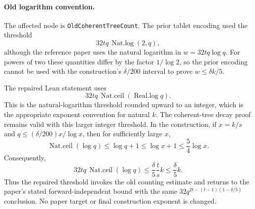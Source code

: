 \paragraph{Old logarithm convention.}
The affected node is \texttt{OldCoherentTreeCount}.  The prior tablet
encoding used the threshold
\[
 32tq\,\operatorname{Nat.log}(2,q),
\]
although the reference paper uses the natural logarithm in
$w=32tq\log q$.  For powers of two these quantities differ by the factor
$1/\log 2$, so the prior encoding cannot be used with the construction's
$\delta/200$ interval to prove $w\leq\delta k/5$.

The repaired Lean statement uses
\[
 32tq\,\operatorname{Nat.ceil}(\operatorname{Real.log}q).
\]
This is the natural-logarithm threshold rounded upward to an integer, which
is the appropriate exponent convention for natural $k$.  The coherent-tree
decay proof remains valid with this larger integer threshold.  In the
construction, if $x=k/s$ and
$q\leq(\delta/200)x/\log x$, then for sufficiently large $x$,
\[
 \operatorname{Nat.ceil}(\log q)
 \leq \log q+1
 \leq \log x+1
 \leq \frac54\log x.
\]
Consequently,
\[
 32tq\,\operatorname{Nat.ceil}(\log q)
 \leq \frac{\delta}{5}\frac{t}{s}k
 \leq \frac{\delta}{5}k.
\]
Thus the repaired threshold invokes the old counting estimate and returns
to the paper's stated forward-independent bound with the same
$32q^{2t-(t-1)(1-\delta/5)}$ conclusion.  No paper target or final
construction exponent is changed.
